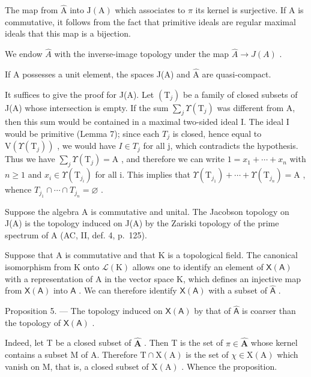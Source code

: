 The map from \(\hat{\mathrm{A}}\) into \(\mathrm{J(A)}\) which associates to \(\pi\) its kernel is surjective. If A is commutative, it follows from the fact that primitive ideals are regular maximal ideals that this map is a bijection.

We endow \(\hat{A}\) with the inverse-image topology under the map \(\hat{A} \rightarrow J(A)\) .

If A possesses a unit element, the spaces J(A) and \(\hat{\mathrm{A}}\) are quasi-compact.

It suffices to give the proof for J(A). Let \((\mathrm{T}_{j})\) be a family of closed subsets of J(A) whose intersection is empty. If the sum \(\sum_{j}\Upsilon(\mathrm{T}_{j})\) was different from A, then this sum would be contained in a maximal two-sided ideal I. The ideal I would be primitive (Lemma 7); since each \(T_{j}\) is closed, hence equal to \(\mathrm{V}(\Upsilon(\mathrm{T}_{j}))\) , we would have \(I\in T_{j}\) for all j, which contradicts the hypothesis. Thus we have \(\sum_{j}\Upsilon(\mathrm{T}_{j})=\mathrm{A}\) , and therefore we can write \(1=x_{1}+\cdots+x_{n}\) with \(n\geqslant1\) and \(x_{i}\in\Upsilon(\mathrm{T}_{j_{i}})\) for all i. This implies that \(\Upsilon(\mathrm{T}_{j_{1}})+\cdots+\Upsilon(\mathrm{T}_{j_{n}})=\mathrm{A}\) , whence \(T_{j_{1}}\cap\cdots\cap T_{j_{n}}=\varnothing\) .

Suppose the algebra A is commutative and unital. The Jacobson topology on J(A) is the topology induced on J(A) by the Zariski topology of the prime spectrum of A (AC, II, def. 4, p.~125).

Suppose that A is commutative and that K is a topological field. The canonical isomorphism from K onto \(\mathcal{L}(\mathrm{K})\) allows one to identify an element of \(\mathsf{X}(\mathsf{A})\) with a representation of A in the vector space K, which defines an injective map from \(\mathsf{X}(\mathsf{A})\) into \(\widehat{\mathsf{A}}\) . We can therefore identify \(\mathsf{X}(\mathsf{A})\) with a subset of \(\widehat{\mathsf{A}}\) .

Proposition 5. — The topology induced on \(\mathsf{X}(\mathsf{A})\) by that of \(\widehat{\mathsf{A}}\) is coarser than the topology of \(\mathsf{X}(\mathsf{A})\) .

Indeed, let T be a closed subset of \(\widehat{\mathbf{A}}\) . Then T is the set of \(\pi \in \widehat{\mathbf{A}}\) whose kernel contains a subset M of A. Therefore \(\mathrm{T} \cap \mathrm{X}(\mathrm{A})\) is the set of \(\chi \in \mathrm{X}(\mathrm{A})\) which vanish on M, that is, a closed subset of \(\mathrm{X}(\mathrm{A})\) . Whence the proposition.

